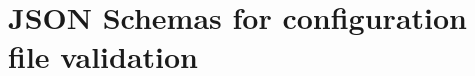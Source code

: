 \chapter{JSON Schemas for configuration file validation}
\label{cha:jsonschemas}

%
\begin{code}
\label{code:rootschema}
\inputminted[linenos,tabsize=2,breaklines]{json}{appendices/schemas/rootschema.json}
\end{code}
\newpage
\begin{code}
\label{code:schemedetection}
\inputminted[linenos,tabsize=2,breaklines]{json}{appendices/schemas/schemedetection.json}
\end{code}
%
